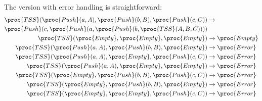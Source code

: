 \noindent The version with error handling is straightforward:
\begin{align*}
\proc{TSS}(\proc{Push}(a,A), \proc{Push}(b,B), \proc{Push}(c,C))
&\rightarrow  \notag\\
\proc{Push}(c, \proc{Push}(a,\proc{Push}(b, \proc{TSS}(A, B, C))))\\
\proc{TSS}(\proc{Empty}, \proc{Empty}, \proc{Empty}) &\rightarrow
\proc{Empty}\\
\proc{TSS}(\proc{Push}(a,A), \proc{Push}(b,B), \proc{Empty})
&\rightarrow \proc{Error}\\
\proc{TSS}(\proc{Push}(a,A), \proc{Empty}, \proc{Push}(c,C))
&\rightarrow \proc{Error}\\
\proc{TSS}(\proc{Push}(a,A), \proc{Empty}, \proc{Empty})
&\rightarrow \proc{Error}\\
\proc{TSS}(\proc{Empty}, \proc{Push}(b,B), \proc{Push}(c,C))
&\rightarrow \proc{Error}\\
\proc{TSS}(\proc{Empty}, \proc{Push}(b,B), \proc{Empty})
&\rightarrow \proc{Error}\\
\proc{TSS}(\proc{Empty}, \proc{Empty}, \proc{Push}(c,C))
&\rightarrow \proc{Error}
\end{align*}
